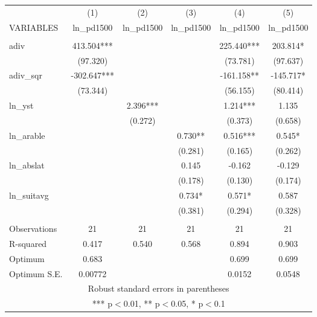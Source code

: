 \documentclass[]{article}
\begin{document}
\begin{tabular}{lccccc} \hline
 & (1) & (2) & (3) & (4) & (5) \\
VARIABLES & ln\_pd1500 & ln\_pd1500 & ln\_pd1500 & ln\_pd1500 & ln\_pd1500 \\ \hline
 &  &  &  &  &  \\
adiv & 413.504*** &  &  & 225.440*** & 203.814* \\
 & (97.320) &  &  & (73.781) & (97.637) \\
adiv\_sqr & -302.647*** &  &  & -161.158** & -145.717* \\
 & (73.344) &  &  & (56.155) & (80.414) \\
ln\_yst &  & 2.396*** &  & 1.214*** & 1.135 \\
 &  & (0.272) &  & (0.373) & (0.658) \\
ln\_arable &  &  & 0.730** & 0.516*** & 0.545* \\
 &  &  & (0.281) & (0.165) & (0.262) \\
ln\_abslat &  &  & 0.145 & -0.162 & -0.129 \\
 &  &  & (0.178) & (0.130) & (0.174) \\
ln\_suitavg &  &  & 0.734* & 0.571* & 0.587 \\
 &  &  & (0.381) & (0.294) & (0.328) \\
 &  &  &  &  &  \\
Observations & 21 & 21 & 21 & 21 & 21 \\
R-squared & 0.417 & 0.540 & 0.568 & 0.894 & 0.903 \\
Optimum & 0.683 &  &  & 0.699 & 0.699 \\
 Optimum S.E. & 0.00772 &  &  & 0.0152 & 0.0548 \\ \hline
\multicolumn{6}{c}{ Robust standard errors in parentheses} \\
\multicolumn{6}{c}{ *** p$<$0.01, ** p$<$0.05, * p$<$0.1} \\
\end{tabular}
\end{document}
